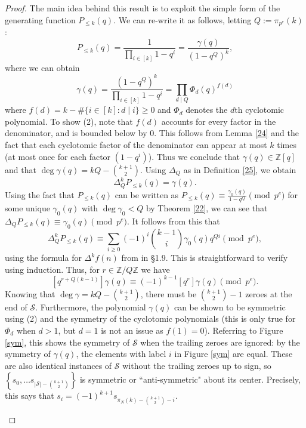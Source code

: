 \documentclass[12pt]{article}
\newcommand{\card}[1]{{\left|{#1}\right|}}
\newcommand{\set}[1]{{\left\{{#1}\right\}}}
\newcommand{\Z}{\mathbb{Z}}
\begin{document}
\begin{proof}
The main idea behind this result is to exploit the simple form of the generating function $P_{\le k}(q)$. We can re-write it as follows, letting $Q := \pi_{p^e}(k)$:
\[P_{\le k}(q) = \frac{1}{\prod_{i\in[k]}{1-q^i}} = \frac{\gamma(q)}{(1-q^{Q})^k}, \tag{1}\]
where we can obtain
\[\gamma(q) = \frac{(1-q^{Q})^k}{\prod_{i\in[k]}{1-q^i}} = \prod_{d \mid Q}{\Phi_d(q)^{f(d)}} \tag{2}\]
where $f(d) =k-\#\{i \in [k] : d \mid i\} \ge 0$ and $\Phi_d$ denotes the $d$th cyclotomic polynomial. To show (2), note that $f(d)$ accounts for every factor in the denominator, and is bounded below by $0$. This follows from Lemma \ref{24} and the fact that each cyclotomic factor of the denominator can appear at most $k$ times (at most once for each factor $(1-q^i)$). Thus we conclude that $\gamma(q) \in \Z[q]$ and that $\deg \gamma(q) = kQ - \binom{k+1}{2}$. Using $\Delta_Q$ as in Definition \ref{25}, we obtain
\[ \Delta_{Q}^k P_{\le k}(q) = \gamma(q).\]
Using the fact that $P_{\le k}(q)$ can be written as $P_{\le k}(q) \equiv \frac{\gamma_0(q)}{1-q^{Q}} \pmod{p^e}$ for some unique $\gamma_0(q)$ with $\deg \gamma_0 < Q$ by Theorem \ref{22}, we can see that $\Delta_{Q} P_{\le k}(q) \equiv \gamma_0(q) \pmod{p^e}$. It follows from this that 
\[\Delta_{Q}^{k} P_{\le k}(q) \equiv \sum_{i\ge 0}{(-1)^i\binom{k-1}{i} \gamma_0(q) q^{Q i}} \pmod{p^e},\]
using the formula for $\Delta^k f(n)$ from \cite{stanley} in \S 1.9. This is straightforward to verify using induction. Thus, for $r \in \Z / Q \Z$ we have
\[[q^{r+Q(k-1)}]\gamma(q) \equiv (-1)^{k-1}[q^r]\gamma(q) \pmod{p^e}.\]
Knowing that $\deg \gamma = kQ - \binom{k+1}{2}$, there must be $\binom{k+1}{2}-1$ zeroes at the end of $\mathcal{S}$. Furthermore, the polynomial $\gamma(q)$ can be shown to be symmetric using (2) and the symmetry of the cyclotomic polynomials (this is only true for $\Phi_d$ when $d>1$, but $d=1$ is not an issue as $f(1)=0$). Referring to Figure \ref{sym}, this shows the symmetry of $\mathcal{S}$ when the trailing zeroes are ignored: by the symmetry of $\gamma(q)$, the elements with label $i$ in Figure \ref{sym} are equal. These are also identical instances of $\mathcal{S}$ without the trailing zeroes up to sign, so $\set{s_{0}, \ldots s_{\card{\mathcal{S}}-\binom{k+1}{2}}}$ is symmetric or ``anti-symmetric" about its center. Precisely, this says that $s_i = (-1)^{k+1} s_{\pi_N(k)-\binom{k+1}{2}-i}$.


\begin{figure}[ht]



\end{figure}
\end{proof}
\end{document}
